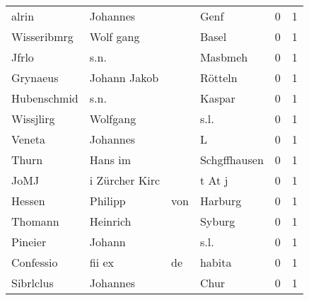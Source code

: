 \documentclass[10pt,a4paper,landscape]{article}
\begin{document}
\begin{longtable}{llllrr}
                    alrin &                           Johannes &             &                                        Genf &          0 &         1 \\
              Wisseribmrg &                          Wolf gang &             &                                       Basel &          0 &         1 \\
                    Jfrlo &                               s.n. &             &                                     Masbmeh &          0 &         1 \\
                 Grynaeus &                       Johann Jakob &             &                                     Rötteln &          0 &         1 \\
              Hubenschmid &                               s.n. &             &                                      Kaspar &          0 &         1 \\
                Wissjlirg &                           Wolfgang &             &                                        s.l. &          0 &         1 \\
                   Veneta &                           Johannes &             &                                           L &          0 &         1 \\
                    Thurn &                            Hans im &             &                                Schgffhausen &          0 &         1 \\
                     JoMJ &                     i Zürcher Kirc &             &                                      t At j &          0 &         1 \\
                   Hessen &                            Philipp &         von &                                     Harburg &          0 &         1 \\
                  Thomann &                           Heinrich &             &                                      Syburg &          0 &         1 \\
                  Pineier &                             Johann &             &                                        s.l. &          0 &         1 \\
                Confessio &                             fii ex &          de &                                      habita &          0 &         1 \\
                Sibrlclus &                           Johannes &             &                                        Chur &          0 &         1 \\

\end{longtable}
\end{document}
